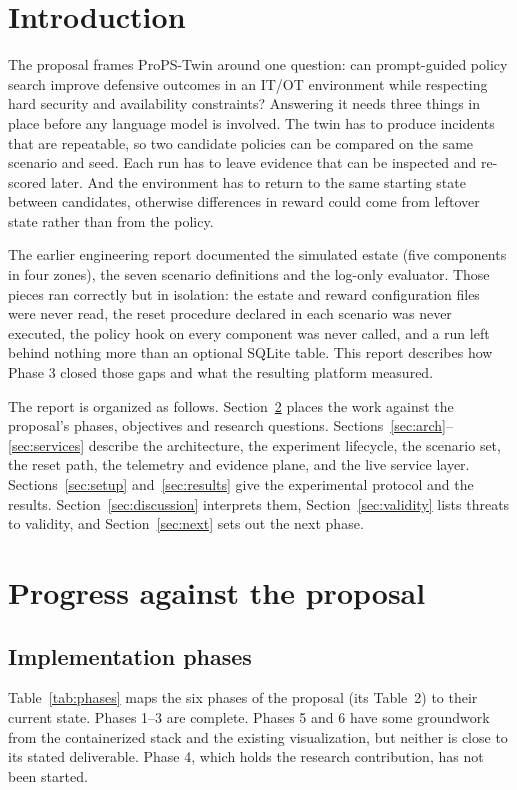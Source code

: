 \documentclass[11pt]{article}
\begin{document}
\section{Introduction}
\label{sec:intro}
The proposal frames ProPS-Twin around one question: can prompt-guided policy
search improve defensive outcomes in an IT/OT environment while respecting hard
security and availability constraints? Answering it needs three things in
place before any language model is involved. The twin has to produce incidents
that are repeatable, so two candidate policies can be compared on the same
scenario and seed. Each run has to leave evidence that can be inspected and
re-scored later. And the environment has to return to the same starting state
between candidates, otherwise differences in reward could come from leftover
state rather than from the policy.

The earlier engineering report documented the simulated estate (five components
in four zones), the seven scenario definitions and the log-only evaluator. Those
pieces ran correctly but in isolation: the estate and reward configuration files
were never read, the reset procedure declared in each scenario was never
executed, the policy hook on every component was never called, and a run left
behind nothing more than an optional SQLite table. This report describes how
Phase 3 closed those gaps and what the resulting platform measured.

The report is organized as follows. Section~\ref{sec:progress} places the work
against the proposal's phases, objectives and research questions.
Sections~\ref{sec:arch}--\ref{sec:services} describe the architecture, the
experiment lifecycle, the scenario set, the reset path, the telemetry and
evidence plane, and the live service layer. Sections~\ref{sec:setup}
and~\ref{sec:results} give the experimental protocol and the results.
Section~\ref{sec:discussion} interprets them, Section~\ref{sec:validity} lists
threats to validity, and Section~\ref{sec:next} sets out the next phase.

\section{Progress against the proposal}
\label{sec:progress}

\subsection{Implementation phases}
Table~\ref{tab:phases} maps the six phases of the proposal (its Table~2) to their
current state. Phases 1--3 are complete. Phases 5 and 6 have some groundwork from
the containerized stack and the existing visualization, but neither is close to
its stated deliverable. Phase 4, which holds the research contribution, has not
been started.
\end{document}

